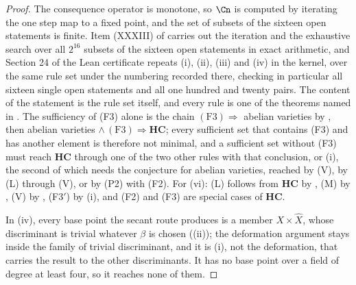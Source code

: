 \begin{proof}
The consequence operator is monotone, so $\Cn$ is computed by iterating the
one step map to a fixed point, and the set of subsets of the sixteen open
statements is finite. Item (XXXIII) of
 carries out the iteration and the exhaustive search
over all $2^{16}$ subsets of the sixteen open statements in exact arithmetic,
and Section 24 of the Lean certificate repeats (i), (ii), (iii) and (iv) in
the kernel, over the same rule set under the numbering recorded there,
checking in particular all sixteen single open statements and all one
hundred and twenty pairs. The content of the statement is the rule set itself, and every rule is
one of the theorems named in . The sufficiency of (F3)
alone is the chain $\mathrm{(F3)}\Rightarrow$ abelian varieties by
, then abelian varieties $\wedge\,\mathrm{(F3)}
\Rightarrow\mathbf{HC}$; every sufficient set that contains (F3) and has
another element is therefore not minimal, and a sufficient set without
(F3) must reach $\mathbf{HC}$ through one of the two other rules with that
conclusion,  or (i), the second of
which needs the conjecture for abelian varieties, reached by \textup{(V)},
by \textup{(L)} through \textup{(V)}, or by (P2) with (F2). For (vi):
\textup{(L)} follows from $\mathbf{HC}$ by ,
\textup{(M)} by , \textup{(V)} by ,
(F3$'$) by (i), and (F2) and (F3) are special cases of
$\mathbf{HC}$.

In (iv), every base point the secant route produces is a member
$X\times\widehat{X}$, whose discriminant is trivial whatever $\beta$ is chosen
((ii)); the deformation argument stays inside the family
of trivial discriminant, and it is (i), not the
deformation, that carries the result to the other discriminants. It has no
base point over a field of degree at least four, so it reaches none of them.
\end{proof}

